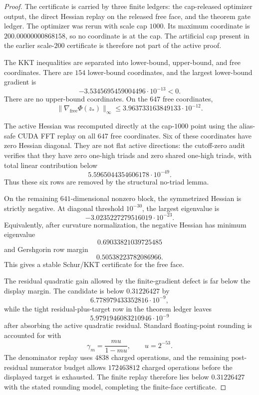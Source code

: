 \documentclass[11pt]{article}
\begin{document}
\begin{proof}
The certificate is carried by three finite ledgers: the cap-released optimizer
output, the direct Hessian replay on the released free face, and the theorem
gate ledger.  The optimizer was rerun with scale cap \(1000\).  Its maximum
coordinate is \(200.00000000868158\), so no coordinate is at the cap.  The
artificial cap present in the earlier scale-\(200\) certificate is therefore
not part of the active proof.

The KKT inequalities are separated into lower-bound, upper-bound, and free
coordinates.  There are \(154\) lower-bound coordinates, and the largest
lower-bound gradient is
\[
   -3.5345695459004496\cdot 10^{-13}<0.
\]
There are no upper-bound coordinates.  On the \(647\) free coordinates,
\[
   \|\nabla_{\mathrm{free}}\Phi(z_*)\|_\infty
      \le 3.963733163849133\cdot 10^{-12}.
\]

The active Hessian was recomputed directly at the cap-\(1000\) point using the
alias-safe CUDA FFT replay on all \(647\) free coordinates.  Six of these
coordinates have zero Hessian diagonal.  They are not flat active directions:
the cutoff-zero audit verifies that they have zero one-high triads and zero
shared one-high triads, with total linear contribution below
\[
   5.5965044354606178\cdot 10^{-49}.
\]
Thus these six rows are removed by the structural no-triad lemma.

On the remaining \(641\)-dimensional nonzero block, the symmetrized Hessian is
strictly negative.  At diagonal threshold \(10^{-30}\), the largest eigenvalue
is
\[
   -3.0235227279516019\cdot 10^{-23}.
\]
Equivalently, after curvature normalization, the negative Hessian has minimum
eigenvalue
\[
   0.69033821039725485
\]
and Gershgorin row margin
\[
   0.50538223782086966.
\]
This gives a stable Schur/KKT certificate for the free face.

The residual quadratic gain allowed by the finite-gradient defect is far below
the display margin.  The candidate is below \(0.31226427\) by
\[
   6.778979433352816\cdot 10^{-9},
\]
while the tight residual-plus-target row in the theorem ledger leaves
\[
   5.9791946083210946\cdot 10^{-9}
\]
after absorbing the active quadratic residual.  Standard floating-point
rounding is accounted for with
\[
   \gamma_m=\frac{mu}{1-mu},\qquad u=2^{-53}.
\]
The denominator replay uses \(4838\) charged operations, and the remaining
post-residual numerator budget allows \(172463812\) charged operations before
the displayed target is exhausted.  The finite replay therefore lies below
\(0.31226427\) with the stated rounding model, completing the finite-face
certificate.
\end{proof}
\end{document}
